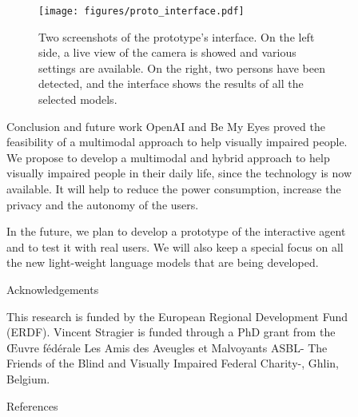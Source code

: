 \documentclass[final]{beamer}
\newlength{\sepwidth}
\newlength{\colwidth}
\newcommand{\separatorcolumn}{\begin{column}{\sepwidth}\end{column}}
\begin{document}
\begin{frame}[t]
\begin{columns}[t]
\begin{column}{\colwidth}
    \end{column}

    \separatorcolumn

    \begin{column}{\colwidth}


      \begin{exampleblock}{}
        \begin{figure}[!ht]
          \centering
          \texttt{[image: figures/proto\_interface.pdf]}
          \caption{Two screenshots of the prototype's interface. On the left side, a live view of the camera is showed and various settings are available. On the right, two persons have been detected, and the interface shows the results of all the selected models.\label{fig:facial_recognition_interface}}
        \end{figure}
      \end{exampleblock}

      \begin{block}{Conclusion and future work}
        OpenAI and Be My Eyes proved the feasibility of a multimodal approach to help visually impaired people. We propose to develop a multimodal and hybrid approach to help visually impaired people in their daily life, since the technology is now available. It will help to reduce the power consumption, increase the privacy and the autonomy of the users.

        In the future, we plan to develop a prototype of the interactive agent and to test it with real users. We will also keep a special focus on all the new light-weight language models that are being developed.
      \end{block}

      \begin{block}{Acknowledgements}

        \footnotesize{This research is funded by the European Regional Development Fund (ERDF). Vincent Stragier is funded through a PhD grant from the Œuvre fédérale Les Amis des Aveugles et Malvoyants ASBL- The Friends of the Blind and Visually Impaired Federal Charity-, Ghlin, Belgium.}

      \end{block}

      \begin{block}{References}

        \footnotesize{}

      \end{block}

    \end{column}

    \separatorcolumn
  \end{columns}
\end{frame}
\end{document}
